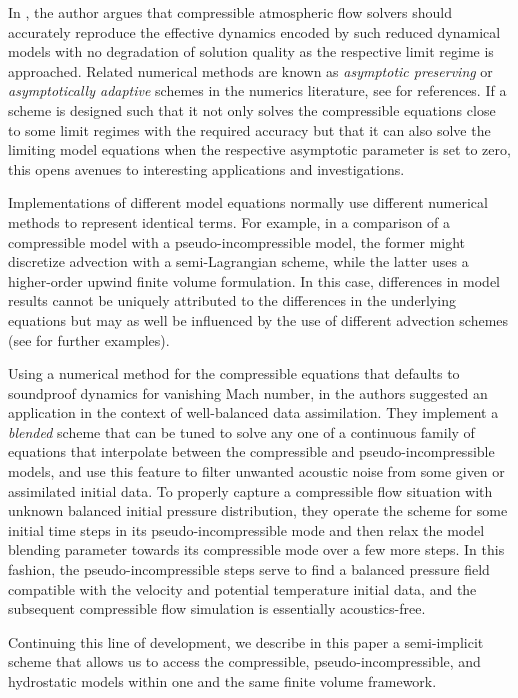 \documentclass[12pt,a4paper]{article}
\theoremstyle{definition}
\begin{document}
In \cite{Cullen2007}, the author argues that compressible atmospheric flow solvers should accurately reproduce the effective dynamics encoded by such reduced dynamical models with no degradation of solution quality as the respective limit regime is approached. Related numerical methods are known as \textit{asymptotic preserving} or \textit{asymptotically adaptive} schemes in the numerics literature, see \cite{Jin2012, KleinEtal2001} for references. If a scheme is designed such that it not only solves the compressible equations close to some limit regimes with the required accuracy but that it can also solve the limiting model equations when the respective asymptotic parameter is set to zero, this opens avenues to interesting applications and investigations.

Implementations of different model equations normally use different numerical methods to represent identical terms. For example, in a comparison of a compressible model with a pseudo-incompressible model, the former might discretize advection with a semi-Lagrangian scheme, while the latter uses a higher-order upwind finite volume formulation. In this case, differences in model results cannot be uniquely attributed to the differences in the underlying equations but may as well be influenced by the use of different advection schemes (see \cite{BenacchioEtAl2014,SmolarkiewiczDoernbrack2007} for further examples).

Using a numerical method for the compressible equations that defaults to soundproof dynamics for vanishing Mach number, in \cite{BenacchioEtAl2014} the authors suggested an application in the context of well-balanced data assimilation. They implement a \textit{blended} scheme that can be tuned to solve any one of a continuous family of equations that interpolate between the compressible and pseudo-incompressible models, and use this feature to filter unwanted acoustic noise from some given or assimilated initial data. To properly capture a compressible flow situation with unknown balanced initial pressure distribution, they operate the scheme for some initial time steps in its pseudo-incompressible mode and then relax the model blending parameter towards its compressible mode over a few more steps. In this fashion, the pseudo-incompressible steps serve to find a balanced pressure field compatible with the velocity and potential temperature initial data, and the subsequent compressible flow simulation is essentially acoustics-free.

Continuing this line of development, we describe in this paper a semi-implicit scheme that allows us to access the compressible, pseudo-incompressible, and hydrostatic models within one and the same finite volume framework. 
\end{document}
